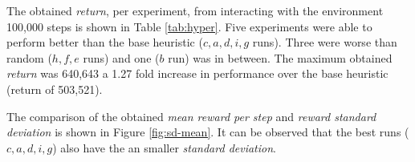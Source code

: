 \documentclass[
  openany]{book}
\begin{document}
The obtained \emph{return}, per experiment, from interacting with the environment 100,000 steps is shown in Table \ref{tab:hyper}. Five experiments were able to perform better than the base heuristic (\(c,a,d,i,g\) runs). Three were worse than random (\(h,f,e\) runs) and one (\(b\) run) was in between. The maximum obtained \emph{return} was 640,643 a 1.27 fold increase in performance over the base heuristic (return of 503,521).

\begin{table}

\caption{\label{tab:hyper}Comparision of obtained returns from the nine runs. The return was computed from playing 100,000 steps per run following the learned policy. The runs are ordered from best to worst and are named from $a$ to $i$, the "heuristic" and "random" baselines are marked as "H" and "R" respectively.}
\centering
{}
\end{table}

The comparison of the obtained \emph{mean reward per step} and \emph{reward standard deviation} is shown in Figure \ref{fig:sd-mean}. It can be observed that the best runs (\(c,a,d,i,g\)) also have the an smaller \emph{standard deviation}.
\end{document}
